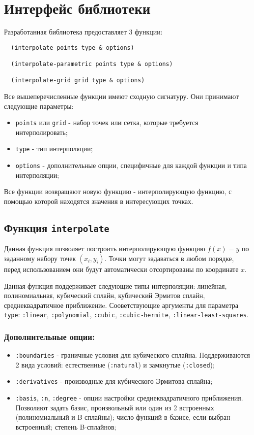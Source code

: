 \section{Интерфейс библиотеки}

Разработанная библиотека предоставляет 3 функции:

\begin{verbatim}
  (interpolate points type & options)

  (interpolate-parametric points type & options)

  (interpolate-grid grid type & options)
\end{verbatim}

Все вышеперечисленные функции имеют сходную сигнатуру. Они принимают следующие параметры:

\begin{itemize}
\item \texttt{points} или \texttt{grid} - набор точек или сетка, которые требуется интерполировать;
\item \texttt{type} - тип интерполяции;
\item \texttt{options} - дополнительные опции, специфичные для каждой функции и типа интерполяции;
\end{itemize}

Все функции возвращают новую функцию - интерполирующую функцию, с помощью которой находятся значения в интересующих точках.

\subsection{Функция \texttt{interpolate}}

Данная функция позволяет построить интерполирующую функцию $f(x) = y$ по заданному набору точек $(x_i, y_i)$. Точки могут задаваться в любом порядке, перед использованием они будут автоматически отсортированы по координате $x$.

Данная функция поддерживает следующие типы интерполяции: линейная, полиномиальная, кубический сплайн, кубический Эрмитов сплайн, среднеквадратичное приближениe. Сооветствующие аргументы для параметра \texttt{type}: \texttt{:linear}, \texttt{:polynomial}, \texttt{:cubic}, \texttt{:cubic-hermite}, \texttt{:linear-least-squares}.

\subsubsection{Дополнительные опции:}
\begin{itemize}
\item \texttt{:boundaries} - граничные условия для кубического сплайна. Поддерживаются 2 вида условий: естественные (\texttt{:natural})
                             и замкнутые (\texttt{:closed});
\item \texttt{:derivatives} - производные для кубического Эрмитова сплайна;
\item \texttt{:basis}, \texttt{:n}, \texttt{:degree} - опции настройки среднеквадратичного приближения. Позволяют задать базис, произвольный или один из 2 встроенных (полиномиальный и B-сплайны); число функций в базисе, если выбран встроенный; степень B-сплайнов;
\end{itemize}


